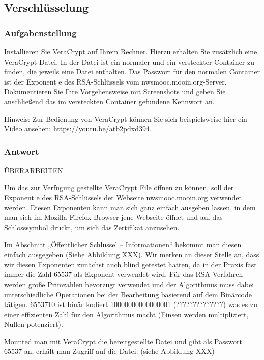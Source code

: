 \documentclass{article}
\begin{document}
\newpage

\subsection{Verschlüsselung}

\subsubsection*{Aufgabenstellung}

Installieren Sie VeraCrypt  auf Ihrem Rechner. Hierzu erhalten Sie zusätzlich eine 
VeraCrypt-Datei. In der Datei ist ein normaler und ein versteckter Container 
zu finden, die jeweils eine Datei enthalten. Das Passwort für den normalen 
Container ist der Exponent e des RSA-Schlüssels vom nwsmooc.mooin.org-Server. 
Dokumentieren Sie Ihre Vorgehensweise mit Screenshots und geben Sie 
anschließend das im versteckten Container gefundene Kennwort an.

Hinweis: Zur Bedienung von VeraCrypt können Sie sich beispielsweise hier ein Video 
ansehen: https://youtu.be/atb2pdxd394.

\subsubsection*{Antwort}

ÜBERARBEITEN

Um das zur Verfügung gestellte VeraCrypt File öffnen zu können, soll der Exponent e 
des RSA-Schlüssels der Webseite nwsmooc.mooin.org verwendet werden. Diesen 
Exponenten kann man sich ganz einfach ausgeben lassen, in dem man sich im Mozilla 
Firefox Browser jene Webseite öffnet und auf das Schlosssymbol drückt, um sich 
das Zertifikat anzusehen.

Im Abschnitt „Öffentlicher Schlüssel – Informationen“ bekommt man diesen einfach 
ausgegeben (Siehe Abbildung XXX). Wir merken an dieser Stelle an, dass wir diesen 
Exponenten zunächst auch blind getestet hatten, da in der Praxis fast immer die 
Zahl 65537 als Exponent verwendet wird. Für das RSA Verfahren werden große 
Primzahlen bevorzugt verwendet und der Algorithmus muss dabei unterschiedliche 
Operationen bei der Bearbeitung basierend auf dem Binärcode tätigen. 6553710 ist 
binär kodiert 10000000000000001 (??????????????)
was es zu einer effizienten Zahl für den Algorithmus macht (Einsen werden 
multipliziert, Nullen potenziert).

Mounted man mit VeraCrypt die bereitgestellte Datei und gibt als Passwort 65537 an, 
erhält man Zugriff auf die Datei. (siehe Abbildung XXX)
\end{document}
